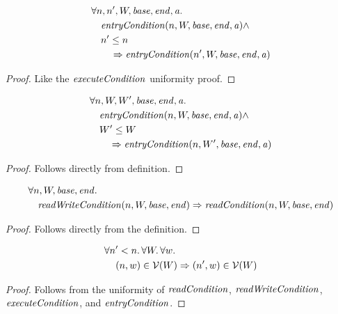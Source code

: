 \documentclass{article}
\newcommand{\var}[1]{\mathit{#1}}
\newcommand{\addr}{\var{a}}
\newcommand{\start}{\var{base}}
\newcommand{\addrend}{\var{end}}
\newcommand{\plainfun}[2]{
  \ifthenelse{\equal{#2}{}}
             {\mathit{#1}}
             {\mathit{#1}(#2)}
}
\newcommand{\readCond}[1]{\plainfun{readCondition}{#1}}
\newcommand{\writeCond}[1]{\plainfun{readWriteCondition}{#1}}
\newcommand{\execCond}[1]{\plainfun{executeCondition}{#1}}
\newcommand{\entryCond}[1]{\plainfun{entryCondition}{#1}}
\newcommand{\asmType}{\plaindom{AsmType}}
\newcommand{\plaindom}[1]{\mathrm{#1}}
\newcommand{\intr}[2]{\mathcal{#1}}
\newcommand{\valueintr}[1]{\intr{V}{#1}}
\newcommand{\stdvr}{\valueintr{\asmType}}
\newcommand{\npair}[2][n]{\left(#1,#2 \right)}
\begin{document}
\begin{lemma}
  \begin{align*}
    & \forall n,n',W,\start, \addrend, \addr \ldotp\\
    &\quad  \entryCond{n,W,\start,\addrend,\addr} \land \\
    &\quad  n' \leq n \\
    &\qquad \Rightarrow \entryCond{n',W,\start,\addrend,\addr}
  \end{align*}
\end{lemma}
\begin{proof}
  Like the $\execCond{}$ uniformity proof.
\end{proof}

\begin{lemma}
  \label{lem:entryCond-mono-world}
  \begin{align*}
    & \forall n,W,W',\start, \addrend, \addr \ldotp\\
    &\quad  \entryCond{n,W,\start,\addrend,\addr} \land \\
    &\quad  W' \leq W \\
    &\qquad \Rightarrow \entryCond{n,W',\start,\addrend,\addr}
  \end{align*}
\end{lemma}
\begin{proof}
  Follows directly from definition.
\end{proof}

\begin{lemma}
  \begin{align*}
    &\forall n, W, \start, \addrend \ldotp\\ 
    &\quad \writeCond{n,W,\start,\addrend} \Rightarrow \readCond{n,W,\start,\addrend}
  \end{align*}
\end{lemma}
\begin{proof}
  Follows directly from the definition.
\end{proof}

\begin{lemma}
\label{lem:stdvr-uniform-step}
  \begin{align*}
    &\forall n' < n \ldotp \forall W \ldotp \forall w \ldotp\\
    &\quad \npair{w} \in \stdvr(W) \Rightarrow \npair[n']{w} \in \stdvr(W)
  \end{align*}
\end{lemma}
\begin{proof}
  Follows from the uniformity of $\readCond{}$, $\writeCond{}$, $\execCond{}$, and $\entryCond{}$.
\end{proof}
\end{document}
